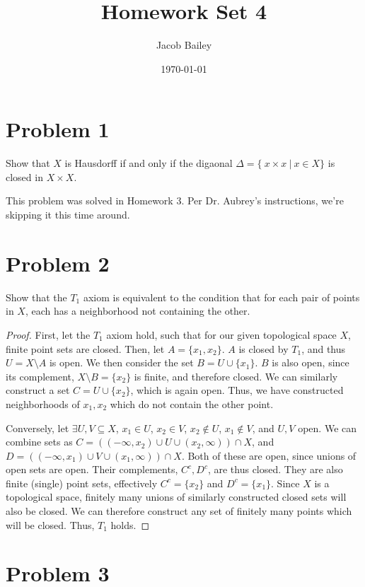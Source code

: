 \documentclass[11pt]{article}
\author{Jacob Bailey}
\date{\today}
\title{Homework Set 4}
\begin{document}
\maketitle

\section{Problem 1}
\label{sec:orge0a8a35}

Show that \(X\) is Hausdorff if and only if the digaonal \(\Delta = \{\
x\times x\ |\ x\in X\}\) is closed in \(X\times X\). 

This problem was solved in Homework 3. Per Dr. Aubrey's instructions,
we're skipping it this time around. 

\section{Problem 2}
\label{sec:orge9794e6}

Show that the \(T_1\) axiom is equivalent to the condition that for each
pair of points in \(X\), each has a neighborhood not containing the
other. 

\begin{proof}
First, let the \(T_1\) axiom hold, such that for our given topological
space \(X\), finite point sets are closed. Then, let \(A = \{ x_1,
x_2\}\). \(A\) is closed by \(T_1\), and thus \(U = X\setminus A\) is
open. We then consider the set \(B = U\cup \{x_1\}\). \(B\) is also open,
since its complement, \(X\setminus B = \{x_2\}\) is finite, and
therefore closed. We can similarly construct a set \(C = U\cup
\{x_2\}\), which is again open. Thus, we have constructed neighborhoods
of \(x_1, x_2\) which do not contain the other point. 

Conversely, let \(\exists U,V\subseteq X\), \(x_1\in U\), \(x_2\in V\),
\(x_2\not\in U\), \(x_1\not\in V\), and \(U,V\) open. We can combine sets as
\(C = ((-\infty, x_2)\cup U \cup (x_2, \infty))\cap X\), and \(D =
((-\infty, x_1)\cup V \cup (x_1, \infty))\cap X\). Both of these are
open, since unions of open sets are open. Their complements, \(C^c,
D^c\), are thus closed. They are also finite (single) point sets,
effectively \(C^c = \{x_2\}\) and \(D^c = \{x_1\}\). Since \(X\) is a
topological space, finitely many unions of similarly constructed
closed sets will also be closed. We can therefore construct any set of
finitely many points which will be closed. Thus, \(T_1\) holds.
\end{proof}
\section{Problem 3}
\label{sec:orgffc9b19}
\end{document}
